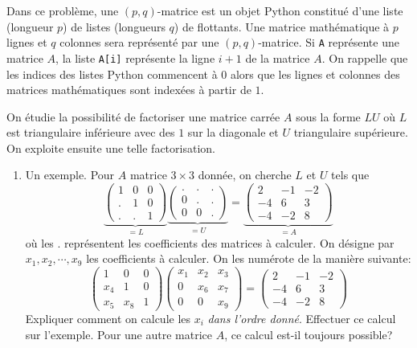 Dans ce problème, une $(p,q)$-matrice est un objet Python constitué d'une liste (longueur $p$) de listes (longueurs $q$) de flottants. Une matrice mathématique à $p$ lignes et $q$ colonnes sera représenté par une $(p,q)$-matrice. Si \texttt{A} représente une matrice $A$, la liste \texttt{A[i]} représente la ligne $i+1$ de la matrice $A$. On rappelle que les indices des listes Python commencent à $0$ alors que les lignes et colonnes des matrices mathématiques sont indexées à partir de $1$. 

On étudie la possibilité de factoriser une matrice carrée $A$ sous la forme $LU$ où $L$ est triangulaire inférieure avec des $1$ sur la diagonale et $U$ triangulaire supérieure. On exploite ensuite une telle factorisation. 
\begin{enumerate}
  \item Un exemple. Pour $A$ matrice $3\times 3$ donnée, on cherche $L$ et $U$ tels que 
\begin{displaymath}
\underset{=L}{\underbrace{
\begin{pmatrix}
  1 & 0 & 0 \\ . & 1 & 0 \\ . & . & 1
\end{pmatrix}
}}
\underset{=U}{\underbrace{
\begin{pmatrix}
  . & . & . \\ 0 & . & . \\ 0 & 0 & .
\end{pmatrix}
}}
= 
\underset{=A}{\underbrace{
\begin{pmatrix}
2 & -1 & -2  \\ -4 & 6 & 3 \\ -4 & -2 & 8  
\end{pmatrix}
}}
\end{displaymath}
où les $.$ représentent les coefficients des matrices à calculer.\newline
On désigne par $x_1,x_2,\cdots, x_9$ les coefficients à calculer. On les numérote de la manière suivante:
\begin{displaymath}
\begin{pmatrix}
  1 & 0 & 0 \\ x_4 & 1 & 0 \\ x_5 & x_8 & 1
\end{pmatrix}
\begin{pmatrix}
  x_1 & x_2 & x_3 \\ 0 & x_6 & x_7 \\ 0 & 0 & x_9
\end{pmatrix}
= 
\begin{pmatrix}
2 & -1 & -2  \\ -4 & 6 & 3 \\ -4 & -2 & 8  
\end{pmatrix}
\end{displaymath}
Expliquer comment on calcule les $x_i$ \emph{dans l'ordre donné}. Effectuer ce calcul sur l'exemple. Pour une autre matrice $A$, ce calcul est-il toujours possible?  


\end{enumerate}
